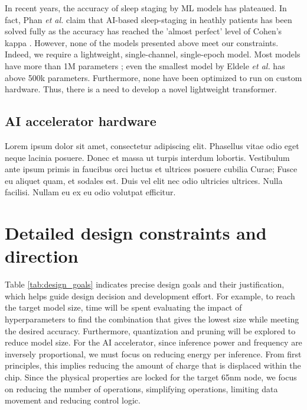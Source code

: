 \documentclass[12pt]{article}
\begin{document}
    In recent years, the accuracy of sleep staging by ML models has plateaued. In fact, Phan \textit{et al.} claim that AI-based sleep-staging in heathly patients has been solved fully as the accuracy has reached the 'almost perfect' level of Cohen's kappa \cite{phan2022automatic}. However, none of the models presented above meet
    our constraints. Indeed, we require a lightweight, single-channel, single-epoch model. Most models have more than 1M parameters \cite{phan2022sleeptransformer}; even the smallest model by Eldele \textit{et al.} has above 500k parameters. Furthermore, none have been optimized to run on custom hardware. Thus, there is a need to develop a novel
    lightweight transformer.

    \subsection{AI accelerator hardware}
    Lorem ipsum dolor sit amet, consectetur adipiscing elit. Phasellus vitae odio eget neque lacinia posuere. Donec et massa ut turpis interdum lobortis. Vestibulum ante ipsum primis
    in faucibus orci luctus et ultrices posuere cubilia Curae; Fusce eu aliquet quam, et sodales est. Duis vel elit nec odio ultricies ultrices. Nulla facilisi. Nullam eu ex eu odio volutpat efficitur.

    \section{Detailed design constraints and direction}
    Table \ref{tab:design_goals} indicates precise design goals and their justification, which helps guide design decision and development effort. For example, to reach the target model size, time will be spent evaluating
    the impact of hyperparameters to find the combination that gives the lowest size while meeting the desired accuracy. Furthermore, quantization and pruning will be explored to reduce model size. For the AI accelerator,
    since inference power and frequency are inversely proportional, we must focus on reducing energy per inference. From first principles, this implies reducing the amount of charge that is displaced within the chip. Since
    the physical properties are locked for the target 65nm node, we focus on reducing the number of operations, simplifying operations, limiting data movement and reducing control logic.
\end{document}
